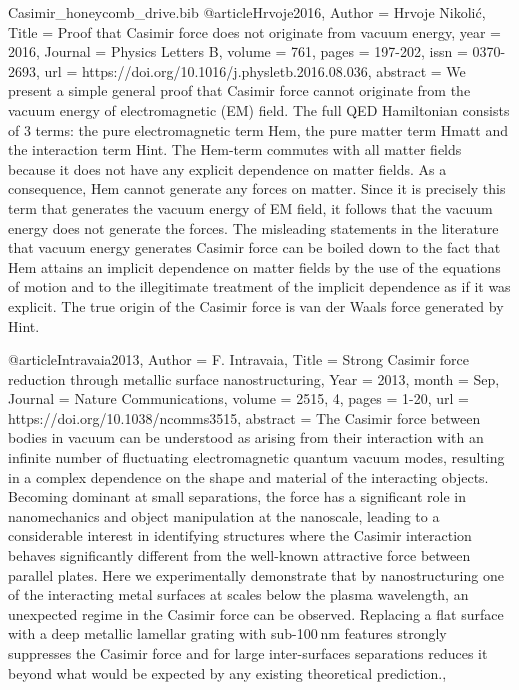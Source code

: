 \documentclass[twoside, 10pt, ptm]{article}
\def\myfilename{Casimir_honeycomb_drive}
\begin{document}
\begin{multicols}{2}
\begin{filecontents}{\myfilename.bib}
@article{Hrvoje2016,
    Author = {Hrvoje Nikolić},
    Title = {Proof that Casimir force does not originate from vacuum energy},
    year = {2016},
    Journal = {Physics Letters B},
    volume = {761},
    pages = {197-202},
    issn = {0370-2693},
    url = {https://doi.org/10.1016/j.physletb.2016.08.036},
    abstract = {We present a simple general proof that Casimir force cannot originate from the vacuum energy of electromagnetic (EM) field. The full QED Hamiltonian consists of 3 terms: the pure electromagnetic term Hem, the pure matter term Hmatt and the interaction term Hint. The Hem-term commutes with all matter fields because it does not have any explicit dependence on matter fields. As a consequence, Hem cannot generate any forces on matter. Since it is precisely this term that generates the vacuum energy of EM field, it follows that the vacuum energy does not generate the forces. The misleading statements in the literature that vacuum energy generates Casimir force can be boiled down to the fact that Hem attains an implicit dependence on matter fields by the use of the equations of motion and to the illegitimate treatment of the implicit dependence as if it was explicit. The true origin of the Casimir force is van der Waals force generated by Hint.}
}




@article{Intravaia2013,
    Author = {F. Intravaia},
    Title = {Strong Casimir force reduction through metallic surface nanostructuring},
    Year = {2013},
    month = {Sep},
    Journal = {Nature Communications},
    volume = {2515, 4},
    pages = {1-20},
    url = {https://doi.org/10.1038/ncomms3515},
    abstract = {The Casimir force between bodies in vacuum can be understood as arising from their interaction with an infinite number of fluctuating electromagnetic quantum vacuum modes, resulting in a complex dependence on the shape and material of the interacting objects. Becoming dominant at small separations, the force has a significant role in nanomechanics and object manipulation at the nanoscale, leading to a considerable interest in identifying structures where the Casimir interaction behaves significantly different from the well-known attractive force between parallel plates. Here we experimentally demonstrate that by nanostructuring one of the interacting metal surfaces at scales below the plasma wavelength, an unexpected regime in the Casimir force can be observed. Replacing a flat surface with a deep metallic lamellar grating with sub-100 nm features strongly suppresses the Casimir force and for large inter-surfaces separations reduces it beyond what would be expected by any existing theoretical prediction.},
}


\end{filecontents}
\end{multicols}
\end{document}
